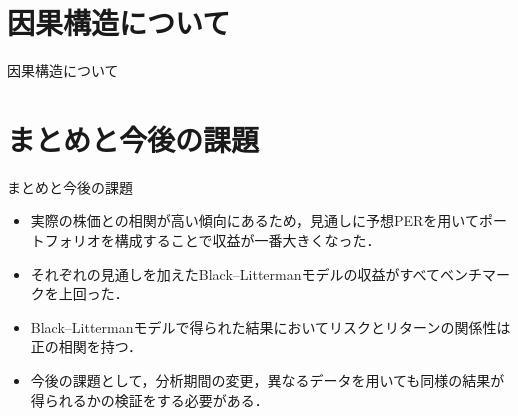 \documentclass[dvipdfmx]{beamer}
\begin{document}
\section{因果構造について}
\begin{frame}{因果構造について}

\end{frame}



\section{まとめと今後の課題}
\begin{frame}{まとめと今後の課題}
\begin{itemize}
\setlength{\itemsep}{0.5cm}
\item %
実際の株価との相関が高い傾向にあるため，見通しに予想PERを用いてポートフォリオを構成することで収益が一番大きくなった．

\item それぞれの見通しを加えたBlack--Littermanモデルの収益がすべてベンチマークを上回った．



\item Black--Littermanモデルで得られた結果においてリスクとリターンの関係性は正の相関を持つ．

\item 今後の課題として，分析期間の変更，異なるデータを用いても同様の結果が得られるかの検証をする必要がある．
\end{itemize}
\end{frame}
\end{document}
